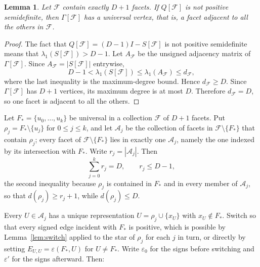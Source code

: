 \documentclass[11pt,reqno]{amsart}
\numberwithin{equation}{section}
\theoremstyle{plain}
\newtheorem{lemma}[theorem]{Lemma}
\theoremstyle{definition}
\newcommand{\eps}{\varepsilon}
\newcommand{\Aset}{\mathcal A}
\newcommand{\Fset}{\mathcal F}
\begin{document}
\begin{lemma}\label{lem:universal}
Let $\Fset$ contain exactly $D+1$ facets. If $Q[\Fset]$ is not positive semidefinite, then
$\Gamma[\Fset]$ has a universal vertex, that is, a facet adjacent to all the others in $\Fset$.
\end{lemma}

\begin{proof}
The fact that $Q[\Fset]=(D-1)I-S[\Fset]$ is not positive semidefinite means that
$\lambda_1(S[\Fset])>D-1$. Let $A_{\Fset}$ be the unsigned adjacency matrix of
$\Gamma[\Fset]$. Since $A_{\Fset}=|S[\Fset]|$ entrywise,
\[
  D-1<\lambda_1(S[\Fset])
  \le\lambda_1(A_{\Fset})
  \le d_{\Fset},
\]
where the last inequality is the maximum-degree bound. Hence $d_{\Fset}\ge D$. Since
$\Gamma[\Fset]$ has $D+1$ vertices, its maximum degree is at most $D$. Therefore
$d_{\Fset}=D$, so one facet is adjacent to all the others.
\end{proof}

Let $F_*=\{u_0,\dots,u_k\}$ be universal in a collection $\Fset$ of $D+1$ facets. Put
$\rho_j=F_*\setminus\{u_j\}$ for $0\le j\le k$, and let $\Aset_j$ be the collection of facets in
$\Fset\setminus\{F_*\}$ that contain $\rho_j$; every facet of $\Fset\setminus\{F_*\}$ lies in
exactly one $\Aset_j$, namely the one indexed by its intersection with $F_*$. Write
$r_j=|\Aset_j|$. Then
\begin{equation}\label{eq:groupsizes}
  \sum_{j=0}^{k}r_j=D,\qquad r_j\le D-1,
\end{equation}
the second inequality because $\rho_j$ is contained in $F_*$ and in every member of $\Aset_j$, so
that $d(\rho_j)\ge r_j+1$, while $d(\rho_j)\le D$.

Every $U\in\Aset_j$ has a unique representation $U=\rho_j\cup\{x_U\}$ with $x_U\notin F_*$.
Switch so that every signed edge incident with $F_*$ is positive, which is possible by
Lemma~\ref{lem:switch} applied to the star of $\rho_j$ for each $j$ in turn, or directly by
setting $E_{U,U}=\eps(F_*,U)$ for $U\ne F_*$. Write $\eps_0$ for the signs before switching and
$\eps'$ for the signs afterward. Then:
\end{document}
